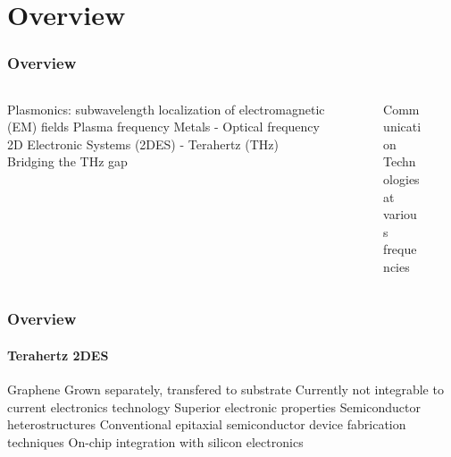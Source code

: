 \documentclass[mathserif,16pt,xcolor=table]{beamer}
\begin{document}
\section{Overview}
\begin{frame}
  \frametitle{Overview}
  \begin{columns} %
    \begin{column}{.5\textwidth} \vspace*{-1cm}
      \begin{outline}[itemize]
        \1 Plasmonics: subwavelength localization of electromagnetic (EM) fields
        \1 Plasma frequency
        \2 Metals - Optical frequency
        \2 2D Electronic Systems (2DES) - Terahertz (THz)
        \1 Bridging the THz gap
      \end{outline}
    \end{column}
    \begin{column}{.5\textwidth}
      \begin{figure}
        \centering \hspace*{-0.75cm}
        \fontsize{6}{7}\selectfont
        \def\svgwidth{1.1\linewidth}
        
        \label{fig:spp_2deg}
        \caption{Communication Technologies at various frequencies}
      \end{figure}
      \end{column}%
    \end{columns}
  \end{frame}
  \begin{frame}
    \frametitle{Overview}
    \framesubtitle{Terahertz 2DES}
    \begin{outline}[itemize]
      \1 Graphene
      \2 Grown separately, transfered to substrate
      \2 Currently not integrable to current electronics technology
      \2 Superior electronic properties
      \1 Semiconductor heterostructures
      \2 Conventional epitaxial semiconductor device fabrication techniques
      \2 On-chip integration with silicon electronics
    \end{outline}
  \end{frame}
\end{document}

